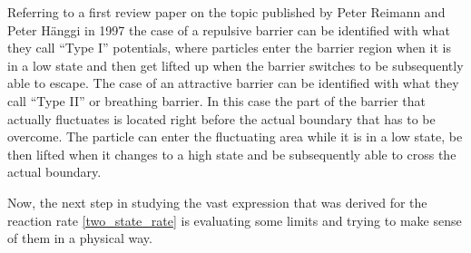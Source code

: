 Referring to a first review paper on the topic published by Peter Reimann and Peter H\"anggi in 1997 \cite{Reimann1997} the case of a repulsive barrier can be identified with what they call ``Type I'' potentials, where particles enter the barrier region when it is in a low state and then get lifted up when the barrier switches to be subsequently able to escape. The case of an attractive barrier can be identified with what they call ``Type II'' or breathing barrier. In this case the part of the barrier that actually fluctuates is located right before the actual boundary that has to be overcome. The particle can enter the fluctuating area while it is in a low state, be then lifted when it changes to a high state and be subsequently able to cross the actual boundary. \par

Now, the next step in studying the vast expression that was derived for the reaction rate \eqref{two_state_rate} is evaluating some limits and trying to make sense of them in a physical way.
\newpage
